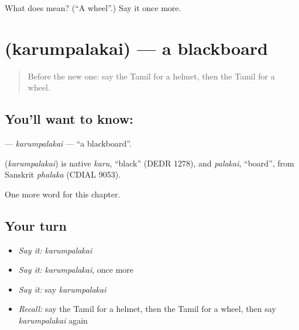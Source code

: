 \begin{tcolorbox}[breakable,colback=teal!4,colframe=teal!35!black,title={Before you move on}]
What does  mean? (\textquotedblleft{}A wheel\textquotedblright{}.) Say it once more.
\end{tcolorbox}
\section[\texorpdfstring{\ta{கரும்பலகை} (karumpalakai)}{கரும்பலகை (karumpalakai)}]{ (karumpalakai) — a blackboard}

\label{lesson:TA-C221-karumpalakai}



\begin{quote}
Before the new one: say the Tamil for a helmet, then the Tamil for a wheel.
\end{quote}

\subsection*{You'll want to know: }
\textbf{} — \emph{karumpalakai} — \textquotedblleft{}a blackboard\textquotedblright{}.

\begin{cousinweb}
\textbf{} (\emph{karumpalakai}) is native \emph{karu}, \textquotedblleft{}black\textquotedblright{} (DEDR 1278), and \emph{palakai}, \textquotedblleft{}board\textquotedblright{}, from Sanskrit \emph{phalaka} (CDIAL 9053).
\end{cousinweb}

\begin{grammarlens}[title={What you've built}]
One more word for this chapter.
\end{grammarlens}

\subsection*{Your turn}
\begin{itemize}
\raggedright
  \item \emph{Say it:} \emph{karumpalakai}
  \item \emph{Say it:} \emph{karumpalakai}, once more
  \item \emph{Say it:} say \emph{karumpalakai}
  \item \emph{Recall:} say the Tamil for a helmet, then the Tamil for a wheel, then say \emph{karumpalakai} again
\end{itemize}

